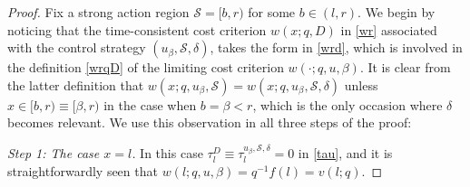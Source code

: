 \documentclass[11pt]{article} %
\numberwithin{komcounter}{section}
\begin{document}
\begin{proof} 
Fix a strong action region $\mathcal{S}=[b,r)$ for some $b \in (l,r)$. 
We begin by noticing that the time-consistent cost criterion $w(x;q,D)$ in \eqref{wr} associated with the control strategy $(u_\beta,\mathcal{S},\delta)$, takes the form in \eqref{wrd}, which is involved in the definition \eqref{wrqD} of the limiting cost criterion $w(\cdot;q,u,\beta)$. 
It is clear from the latter definition that $w(x;q, u_\beta, \mathcal{S}) =
w(x;q, u_\beta, \mathcal{S},\delta)$ unless $x \in [b,r) \equiv [\beta,r)$ in the case when $b=\beta<r$, which is the only occasion where $\delta$ becomes relevant. 
We use this observation in all three steps of the proof:

\vspace{1mm}
{\it Step 1: The case $x=l$.} 
In this case $\tau^D_l \equiv \tau^{u_\beta,\mathcal{S},\delta}_l = 0$ in \eqref{tau}, 
and it is straightforwardly seen that $w(l;q,u,\beta) = q^{-1}f(l) = v(l;q)$. 


\end{proof}
\end{document}
